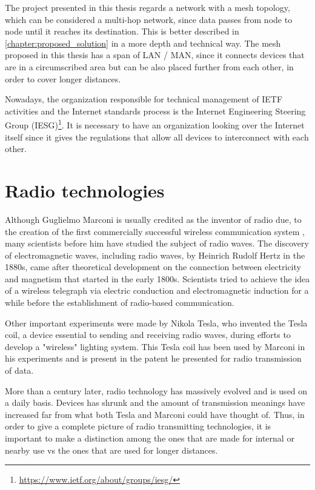 		The project presented in this thesis regards a network with a mesh topology, which can be considered a multi-hop network, since data passes from node to node until it reaches its destination.
		This is better described in \ref{chapter:proposed_solution} in a more depth and technical way.
		The mesh proposed in this thesis has a span of LAN / MAN, since it connects devices that are in a circumscribed area but can be also placed further from each other, in order to cover longer distances.
	
		
		Nowadays, the organization responsible for technical management of IETF activities and the Internet standards process is the Internet Engineering Steering Group (IESG)\footnote{\url{https://www.ietf.org/about/groups/iesg/}}.
		It is necessary to have an organization looking over the Internet itself since it gives the regulations that allow all devices to interconnect with each other.
	
	\section{Radio technologies}\label{sec:radio_tech}
		
		Although Guglielmo Marconi is usually credited as the inventor of radio due, to the creation of the first commercially successful wireless communication system \cite{4137304}, many scientists before him have studied the subject of radio waves.
		The discovery of electromagnetic waves, including radio waves, by Heinrich Rudolf Hertz in the 1880s, came after theoretical development on the connection between electricity and magnetism that started in the early 1800s.
		Scientists tried to achieve the idea of a wireless telegraph via electric conduction and electromagnetic induction for a while before the establishment of radio-based communication.
		
		Other important experiments were made by Nikola Tesla, who invented the Tesla coil, a device essential to sending and receiving radio waves, during efforts to develop a "wireless" lighting system.
		This Tesla coil has been used by Marconi in his experiments and is present in the patent he presented for radio transmission of data.
		
		More than a century later, radio technology has massively evolved and is used on a daily basis.
		Devices has shrunk and the amount of transmission meanings have increased far from what both Tesla and Marconi could have thought of.
		Thus, in order to give a complete picture of radio transmitting technologies, it is important to make a distinction among the ones that are made for internal or nearby use vs the ones that are used for longer distances.
		

